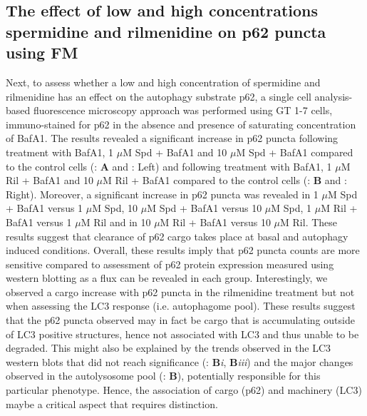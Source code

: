 {\subsection{The effect of low and high concentrations spermidine and rilmenidine on p62 puncta using FM}
Next, to assess whether a low and high concentration of spermidine and rilmenidine has an effect on the autophagy substrate p62, a single cell analysis-based fluorescence microscopy approach was performed using GT 1-7 cells, immuno-stained for p62 in the absence and presence of saturating concentration of BafA1. The results revealed a significant increase in p62 puncta following treatment with BafA1, 1 $\mu$M Spd + BafA1 and 10 $\mu$M Spd + BafA1 compared to the control cells (: \textbf{A} and : Left) and following treatment  with BafA1, 1 $\mu$M Ril + BafA1  and 10 $\mu$M Ril + BafA1 compared to the control cells (: \textbf{B} and : Right). Moreover, a significant increase in p62 puncta was revealed in 1 $\mu$M Spd + BafA1 versus 1 $\mu$M Spd, 10 $\mu$M Spd + BafA1 versus 10 $\mu$M Spd, 1 $\mu$M Ril + BafA1 versus 1 $\mu$M Ril and in 10 $\mu$M Ril + BafA1 versus 10 $\mu$M Ril. These results suggest that clearance of p62 cargo takes place at basal and autophagy induced conditions. Overall, these results imply that p62 puncta counts are more sensitive compared to assessment of p62 protein expression measured using western blotting as a flux can be revealed in each group. Interestingly, we observed a cargo increase with p62 puncta in the rilmenidine treatment but not when assessing the LC3 response (i.e. autophagome pool). These results suggest that the p62 puncta observed may in fact be cargo that is accumulating outside of LC3 positive structures, hence not associated with LC3 and thus unable to be degraded. This might also be explained by the trends observed in the LC3 western blots that did not reach significance  (: \textbf{B}\textit{i}, \textbf{B}\textit{iii}) and the major changes observed in the autolysosome pool (: \textbf{B}), potentially responsible for this particular phenotype. Hence, the association of cargo (p62) and machinery (LC3) maybe a critical aspect that requires distinction.
  
}

